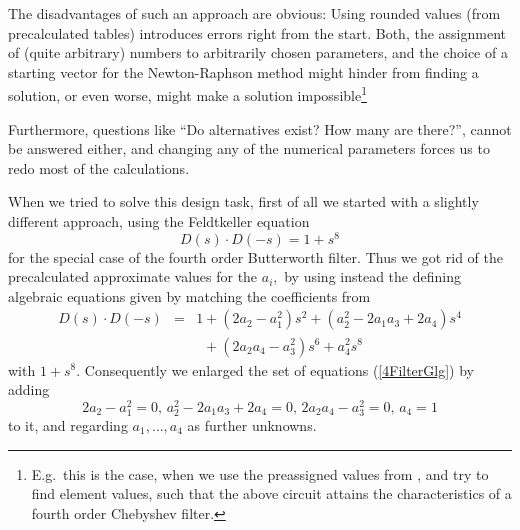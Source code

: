 \documentclass[10pt,twocolumn,pagenumbers]{IEEEtran}
\begin{document}
\noindent
The disadvantages of such an approach are obvious: Using rounded values (from precalculated tables) introduces errors right from the start.  Both, the assignment of (quite arbitrary) numbers to arbitrarily chosen parameters, and the choice of a starting vector for the Newton-Raphson method might hinder from finding a solution, or even worse, might make a solution impossible\footnote{E.g.\ this is the case, when we use the preassigned values from \cite{HieuDiss}, and try to find element values, such that the above circuit attains the characteristics of a fourth order Chebyshev filter.}       

Furthermore, questions like ``Do alternatives exist? How many are there?'', cannot be answered either, and changing any of the numerical parameters forces us to redo most of the calculations.

When we tried to solve this design task, first of all we started with a slightly different approach, using the Feldtkeller equation 
\begin{equation}
D(s)\cdot D(-s) = 1 + s^8
\end{equation}
for the special case of the fourth order Butterworth filter. Thus we got rid of the precalculated approximate values for the $a_i,$ by using instead the defining algebraic equations given by matching the coefficients from
\begin{eqnarray*}
D(s)\cdot D(-s)&=& 1 + (2a_2 - a_1^2) s^2 
+ (a_2^2 - 2 a_1 a_3 + 2 a_4) s^4\\
&&\phantom{1}+ (2 a_2 a_4 - a_3^2) s^6 
+ a_4^2 s^8
\end{eqnarray*}
with $1+s^8.$ Consequently we enlarged the set of equations (\ref{4FilterGlg}) by adding
\begin{equation}
2a_2 - a_1^2 = 0,\, a_2^2 - 2 a_1 a_3 + 2 a_4=0,\, 2 a_2 a_4 - a_3^2=0,\, a_4=1
\label{BW}
\end{equation}
to it, and regarding $a_1,\dots, a_4$ as further unknowns.
\end{document}
